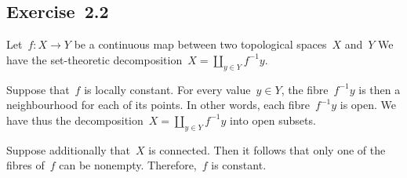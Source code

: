 \subsection{Exercise~2.2}

Let~$f \colon X \to Y$ be a continuous map between two topological spaces~$X$ and~$Y$
We have the set-theoretic decomposition~$X = ∐_{y ∈ Y} f^{-1} y$.

Suppose that~$f$ is locally constant.
For every value~$y ∈ Y$, the fibre~$f^{-1} y$ is then a neighbourhood for each of its points.
In other words, each fibre~$f^{-1} y$ is open.
We have thus the decomposition~$X = ∐_{y ∈ Y} f^{-1} y$ into open subsets.

Suppose additionally that~$X$ is connected.
Then it follows that only one of the fibres of~$f$ can be nonempty.
Therefore,~$f$ is constant.
